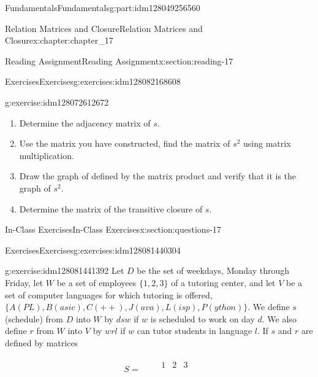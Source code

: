 \documentclass[oneside,10pt,]{book}
\numberwithin{equation}{section}
\begin{document}
\begin{partptx}{Fundamentals}{}{Fundamentals}{}{}{g:part:idm128049256560}
\begin{chapterptx}{Relation Matrices and Closure}{}{Relation Matrices and Closure}{}{}{x:chapter:chapter_17}
\begin{sectionptx}{Reading Assignment}{}{Reading Assignment}{}{}{x:section:reading-17}
\begin{exercises-subsection}{Exercises}{}{Exercises}{}{}{g:exercises:idm128082168608}
\begin{exercisegroup}
\begin{divisionexerciseeg}{1}{}{}{g:exercise:idm128072612672}
\begin{enumerate}[label=(\alph*)]
\item{}Determine the adjacency matrix of \(s\).%
\item{}Use the matrix you have constructed, find the matrix of \(s^2\) using matrix multiplication.%
\item{}Draw the graph of defined by the matrix product and verify that it is the graph of \(s^2\).%
\item{}Determine the matrix of the transitive closure of \(s\).%
\end{enumerate}
%
\end{divisionexerciseeg}%
\end{exercisegroup}
\par\medskip\noindent
\end{exercises-subsection}
\end{sectionptx}
%
%
\typeout{************************************************}
\typeout{************************************************}
%
\begin{sectionptx}{In-Class Exercises}{}{In-Class Exercises}{}{}{x:section:questions-17}
%
%
%
\typeout{************************************************}
\typeout{************************************************}
%
\begin{exercises-subsection}{Exercises}{}{Exercises}{}{}{g:exercises:idm128081440304}
\par\medskip\noindent%
%
\begin{exercisegroup}
\begin{divisionexerciseeg}{1}{}{}{g:exercise:idm128081441392}%
Let \(D\) be the set of weekdays, Monday through Friday, let \(W\) be a set of employees \(\{1, 2, 3\}\) of a tutoring center, and let \(V\) be a set of computer languages for which tutoring is offered,  \(\{A(PL), B(asic), C(++), J(ava), L(isp), P(ython)\}\). We define \(s\) (schedule) from \(D\) into \(W\) by \(d s w\) if \(w\) is scheduled to work on day \(d\). We also define \(r\) from \(W\) into \(V\) by \(w r l\) if \(w\) can tutor students in language \(l\). If \(s\) and \(r\) are defined by matrices%
\par
%
\begin{equation*}
S = 
\begin{array}{cc}
& 
\begin{array}{ccc}
1 & 2 & 3 \\
\end{array}
\\
\begin{array}{c}

\end{array}
\end{array}
\end{equation*}
\end{divisionexerciseeg}
\end{exercisegroup}
\end{exercises-subsection}
\end{sectionptx}
\end{chapterptx}
\end{partptx}
\end{document}
